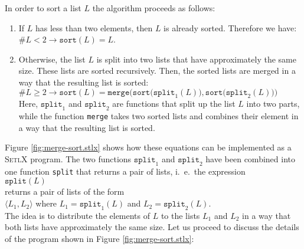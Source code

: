 In order to sort a list $L$ the algorithm proceeds as follows:
\begin{enumerate}
\item If $L$ has less than two elements, then $L$ is already sorted.  Therefore we have: 
      \\[0.2cm]
      \hspace*{1.3cm}
      $\#L < 2 \rightarrow \mathtt{sort}(L) = L$.
\item Otherwise, the list $L$ is split into two lists that have approximately the same size.
      These lists are sorted recursively.  Then, the sorted lists are merged in a way that the
      resulting list is sorted: \\[0.2cm]
      \hspace*{1.3cm} 
      $\#L \geq 2 \rightarrow \mathtt{sort}(L) = \mathtt{merge}\bigl(\mathtt{sort}\bigl(\mathtt{split}_1(L)\bigr), \mathtt{sort}\bigl(\mathtt{split}_2(L)\bigr)\bigr)$
     \\[0.2cm]
     Here, $\texttt{split}_1$ and $\mathtt{split}_2$ are functions that split up the list $L$ into
     two parts, while the function \texttt{merge} takes two sorted lists and combines their element
     in a way that the resulting list is sorted.
\end{enumerate}
Figure \ref{fig:merge-sort.stlx} shows how these equations can be implemented as a \textsc{SetlX}
program.  The two functions $\mathtt{split}_1$ and $\mathtt{split}_2$ have been combined into one
function \texttt{split} that returns a pair of lists, i.~e.~the expression
\\[0.2cm]
\hspace*{1.3cm}
$\mathtt{split}(L)$
\\[0.2cm]
returns a pair of lists of the form
\\[0.2cm]
\hspace*{1.3cm}
$\langle L_1, L_2 \rangle$ \quad where $L_1 = \mathtt{split}_1(L)$ and $L_2 = \mathtt{split}_2(L)$.
\\[0.2cm]
The idea is to distribute the elements of $L$ to the lists $L_1$ and $L_2$ in a way that both lists
have approximately the same size.   Let us proceed to discuss the details of the program shown in
Figure \ref{fig:merge-sort.stlx}:


